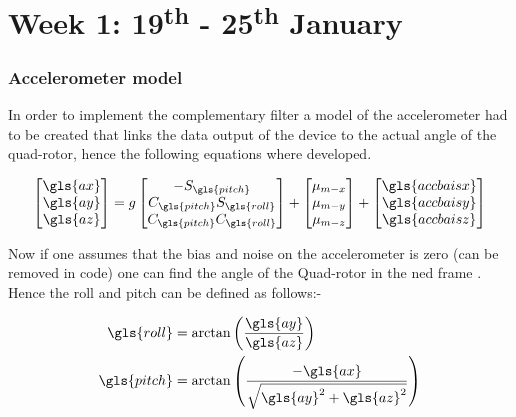 \chapter{Week 1: 19\textsuperscript{th} - 25\textsuperscript{th} January }

 \tocless\subsection{Accelerometer model}
In order to implement the complementary filter a model of the accelerometer had to be created that links the data output of the device to the actual angle of the quad-rotor, hence the following equations where developed.

\begin{equation}
\begin{bmatrix}
\gls{ax} \\ \gls{ay} \\\gls{az}
\end{bmatrix}
= 
g
\begin{bmatrix}
-S_{\gls{pitch}}\\ C_{\gls{pitch}}S_{\gls{roll}}\\C_{\gls{pitch}}C_{\gls{roll}} 
\end{bmatrix}
+
\begin{bmatrix}
\mu_{m-x}\\ \mu_{m-y}\\\mu_{m-z}
\end{bmatrix}		
+
\begin{bmatrix}
\gls{accbaisx}\\ \gls{accbaisy}\\\gls{accbaisz}
\end{bmatrix}
\label{eq:acc simplified equation}
\end{equation}

Now if one assumes that the bias and noise on the accelerometer is zero (can be removed in code)  one can find the angle of the Quad-rotor in the \gls{ned} frame . Hence the \gls{roll} and \gls{pitch} can be defined as follows:-

\begin{align}
\begin{split}
\gls{roll} &= \arctan\left(\frac{\gls{ay}}{\gls{az}}\right)\\
\gls{pitch} &= \arctan \left(\frac{- \gls{ax}}{\sqrt{\gls{ay}^2+\gls{az}^2}}\right)
\label{Eq: angles from acc}
\end{split}
\end{align} 

